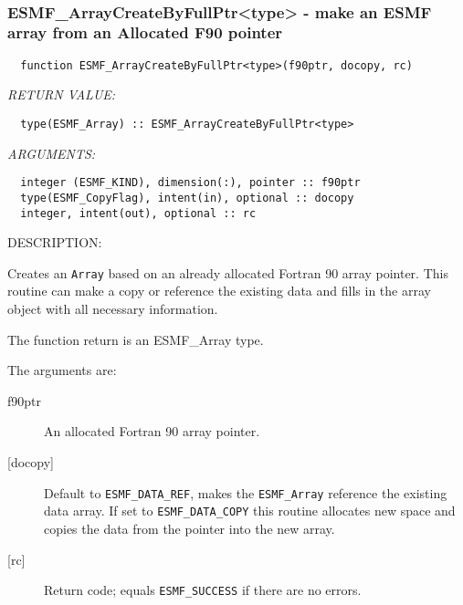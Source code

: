   
 
\mbox{}\hrulefill\ 
 
\subsubsection [ESMF\_ArrayCreateByFullPtr<type>] {ESMF\_ArrayCreateByFullPtr<type> - make an ESMF array from an Allocated F90 pointer }


  
\begin{verbatim}  function ESMF_ArrayCreateByFullPtr<type>(f90ptr, docopy, rc) 
   \end{verbatim}{\em RETURN VALUE:}
\begin{verbatim}  type(ESMF_Array) :: ESMF_ArrayCreateByFullPtr<type> 
   \end{verbatim}{\em ARGUMENTS:}
\begin{verbatim}  integer (ESMF_KIND), dimension(:), pointer :: f90ptr 
  type(ESMF_CopyFlag), intent(in), optional :: docopy 
  integer, intent(out), optional :: rc 
   \end{verbatim}
{\sf DESCRIPTION:\\ }

 
   Creates an {\tt Array} based on an already allocated Fortran 90 array 
   pointer. This routine can make a copy or reference the existing data 
   and fills in the array object with all necessary information. 
   
   The function return is an ESMF\_Array type. 
   
   The arguments are: 
   \begin{description} 
   \item[f90ptr] 
   An allocated Fortran 90 array pointer. 
   
   \item[{[docopy]}] 
   Default to {\tt ESMF\_DATA\_REF}, makes the {\tt ESMF\_Array} reference 
   the existing data array. If set to {\tt ESMF\_DATA\_COPY} this routine 
   allocates new space and copies the data from the pointer into the 
   new array. 
   
   \item[{[rc]}] 
   Return code; equals {\tt ESMF\_SUCCESS} if there are no errors. 
   \end{description} 
     
    
 
\mbox{}\hrulefill\ 
 


